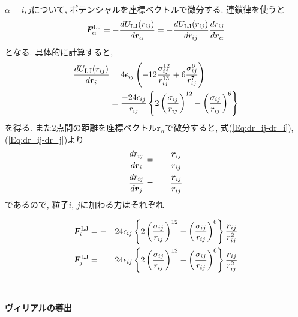 $\alpha = i, j$について, ポテンシャルを座標ベクトルで微分する. 連鎖律を使うと
\begin{equation}
   \bm{F}_{\alpha}^{\mathrm{LJ}}
   =
   -
   \frac{d U_{\mathrm{LJ}}(r_{ij})}{d \bm{r}_{\alpha}}
   =
   -
   \frac{d U_{\mathrm{LJ}}(r_{ij})}{d r_{ij}}
   \frac{d r_{ij}}{d \bm{r}_{\alpha}}
   \notag
\end{equation}
となる. 具体的に計算すると,
\begin{align}
   \frac{d U_{\mathrm{LJ}}(r_{ij})}{d \bm{r}_{i}}
   &=
   4\epsilon_{ij}
   \left(
          -12\frac{\sigma_{ij}^{12}}{r_{ij}^{13}}
          + 6\frac{\sigma_{ij}^{6}}{r_{ij}^{7}}
   \right)
   \notag \\
   &=
   \frac{-24\epsilon_{ij}}{r_{ij}}
   \left\{
       2 \left(\frac{\sigma_{ij}}{r_{ij}}\right)^{12}
      -  \left(\frac{\sigma_{ij}}{r_{ij}}\right)^{6}
   \right\}
   \notag
\end{align}
を得る. また2点間の距離を座標ベクトル$\bm{r}_{\alpha}$で微分すると, 式(\ref{Eq:dr_ij-dr_i}), (\ref{Eq:dr_ij-dr_j})より
\begin{alignat}{3}
   \frac{d r_{ij}}{d \bm{r}_{i}}
   &=
   -&&
   \frac{\bm{r}_{ij}}{r_{ij}}
   \notag
   \\
   \frac{d r_{ij}}{d \bm{r}_{j}}
   &=&&
   \frac{\bm{r}_{ij}}{r_{ij}}
   \notag
\end{alignat}
であるので, 粒子$i$, $j$に加わる力はそれぞれ

\begin{alignat}{3}
 \bm{F}_{i}^{\mathrm{LJ}}
 &=-&&
 24\epsilon_{ij}
   \left\{
           2\left( \frac{\sigma_{ij}}{r_{ij}} \right)^{12}
           -\left( \frac{\sigma_{ij}}{r_{ij}} \right)^{6}
   \right\}
   \frac{\bm{r}_{ij}}{r_{ij}^{2}}
 \notag
 \\
 \bm{F}_{j}^{\mathrm{LJ}}
 &=&&
   24\epsilon_{ij}
   \left\{
           2\left( \frac{\sigma_{ij}}{r_{ij}} \right)^{12}
           -\left( \frac{\sigma_{ij}}{r_{ij}} \right)^{6}
   \right\}
   \frac{\bm{r}_{ij}}{r_{ij}^{2}}
 \notag
\end{alignat}
\\

\paragraph{ヴィリアルの導出}


